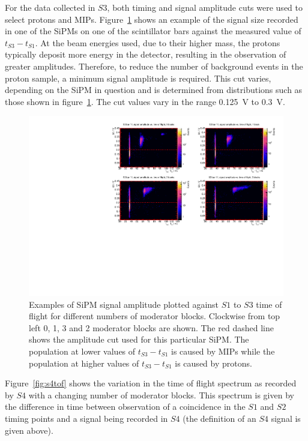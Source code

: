 For the data collected in $\mathit{S3}$, both timing and signal amplitude cuts were used to select protons and MIPs.
Figure~\ref{fig:TvsA} shows an example of the signal size recorded in one of the SiPMs on one of the scintillator bars against the measured value of $t_{\mathit{S3}} - t_{\mathit{S1}}$.
At the beam energies used, due to their higher mass, the protons typically deposit more energy in the detector, resulting in the observation of greater amplitudes.
Therefore, to reduce the number of background events in the proton sample, a minimum signal amplitude is required.
This cut varies, depending on the SiPM in question and is determined from distributions such as those shown in figure~\ref{fig:TvsA}. 
The cut values vary in the range 0.125~V to 0.3~V.

\begin{figure}[ht]
  \centering
  \includegraphics[width=\linewidth]{files/Figures/tvsa.pdf}
  \caption{Examples of SiPM signal amplitude plotted against $\mathit{S1}$ to $\mathit{S3}$ time of flight for different numbers of moderator blocks. Clockwise from top left 0, 1, 3 and 2 moderator blocks are shown. The red dashed line shows the amplitude cut used for this particular SiPM. The population at lower values of $t_{\mathit{S3}}-t_{\mathit{S1}}$ is caused by MIPs while the population at higher values of $t_{\mathit{S3}}-t_{\mathit{S1}}$ is caused by protons.}
  \label{fig:TvsA}
\end{figure}

Figure~\ref{fig:s4tof} shows the variation in the time of flight spectrum as recorded by $\mathit{S4}$ with a changing number of moderator blocks.
This spectrum is given by the difference in time between observation of a coincidence in the $\mathit{S1}$ and $\mathit{S2}$ timing points and a signal being recorded in $\mathit{S4}$ (the definition of an $\mathit{S4}$ signal is given above).

